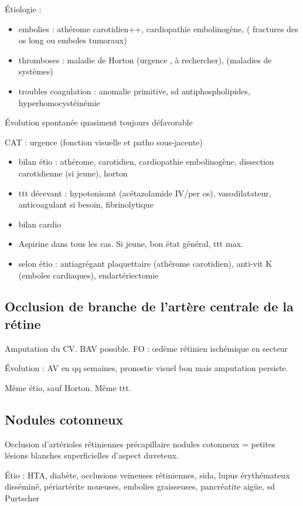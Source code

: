 \documentclass[11pt]{article}
\begin{document}
Étiologie : 
\begin{itemize}
\item embolies : athérome carotidien++, cardiopathie embolinogène, ( fractures des os
long ou emboles tumoraux)
\item thromboses : maladie de Horton (urgence \skull, à rechercher), (maladies de systèmes)
\item troubles coagulation : anomalie primitive, sd antiphospholipides, hyperhomocystéinémie
\end{itemize}

Évolution spontanée quasiment toujours défavorable

CAT : urgence \danger \skull (fonction visuelle et patho sous-jacente)
\begin{itemize}
\item bilan étio : athérome, carotidien, cardiopathie embolinogène, dissection
carotidienne (si jeune), horton
\item ttt décevant : hypotonisant (acétazolamide IV/per os), vasodilatateur,
anticoagulant si besoin, fibrinolytique
\item bilan cardio
\item Aspirine dans tous les cas. Si jeune, bon état général, ttt max.
\item selon étio : antiagrégant plaquettaire (athérome carotidien), anti-vit K (emboles
cardiaques), endartériectomie
\end{itemize}

\subsection{Occlusion de branche de l'artère centrale de la rétine}
\label{sec:org64b2353}
Amputation du CV. BAV possible. FO : \oe{}dème rétinien ischémique en secteur

Évolution : \inc AV en qq semaines, pronostic visuel bon mais amputation
persiste.

Même étio, sauf Horton. Même ttt.

\subsection{Nodules cotonneux}
\label{sec:org6316b4f}
Occlusion d'artérioles rétiniennes précapillaire \thus nodules cotonneux =
petites lésions blanches superficielles d'aspect duveteux.

Étio : HTA, diabète, occlusions veineuses rétiniennes, sida, lupus érythémateux
disséminé, périartérite noueuses, embolies graisseuses, pancréatite aigüe, sd Purtscher
\end{document}
